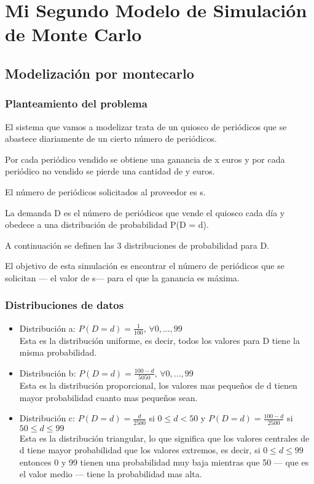 \chapter{Mi Segundo Modelo de Simulación de Monte Carlo}

\section{Modelización por montecarlo}

\subsection{Planteamiento del problema}
El sistema que vamos a modelizar trata de un quiosco de periódicos que se abastece diariamente de un cierto número de periódicos.

Por cada periódico vendido se obtiene una ganancia de x euros y por cada periódico no vendido se pierde una cantidad de y euros.

El número de periódicos solicitados al proveedor es s.

La demanda D es el número de periódicos que vende el quiosco cada día y obedece a una distribución de probabilidad P(D = d).

A continuación se definen las 3 distribuciones de probabilidad para D.

El objetivo de esta simulación es encontrar el número de periódicos que se solicitan --- el valor de s--- para el que la ganancia es máxima.

\subsection{Distribuciones de datos}

\begin{itemize}
	\item Distribución a: $P(D = d) = \frac{1}{100}$, $\forall 0,...,99$ \\ Esta es la distribución uniforme, es decir, todos los valores para D tiene la misma probabilidad.
	\item Distribución b: $P(D = d) = \frac{100 - d}{5050}$, $\forall 0,...,99$ \\ Esta es la distribución proporcional, los valores mas pequeños de d tienen mayor probabilidad cuanto mas pequeños sean.
	\item Distribución c: $P(D = d) = \frac{d}{2500}$ si $ 0 \leq d < 50$ y  $P(D = d) = \frac{100-d}{2500}$ si $ 50 \leq d \leq 99$ \\ Esta es la distribución triangular, lo que significa que los valores centrales de d tiene mayor probabilidad que los valores extremos, es decir, si $ 0 \leq d \leq 99$ entonces 0 y 99 tienen una probabilidad muy baja mientras que 50 --- que es el valor medio --- tiene la probabilidad mas alta.
\end{itemize}



